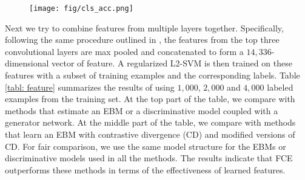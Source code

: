 \documentclass[10pt,twocolumn,letterpaper]{article}
\begin{document}
\begin{figure}
\begin{center}
	\texttt{[image: fig/cls\_acc.png]}
    \label{fig: cls_acc}
\end{center}
\end{figure} 

Next we try to combine features from multiple layers together. Specifically, following the same procedure outlined in \cite{radford2015unsupervised}, the features from the top three convolutional layers are max pooled and concatenated to form a $14,336$-dimensional vector of feature. A regularized L2-SVM is then trained on these features with a subset of training examples and the corresponding labels. Table \ref{tabl: feature} summarizes the results of using $1,000$, $2,000$ and $4,000$ labeled examples from the training set. At the top part of the table, we compare with methods that estimate an EBM or a discriminative model coupled with a generator network. At the middle part of the table, we compare with methods that learn an EBM with contrastive divergence (CD) and modified versions of CD. For fair comparison, we use the same model structure for the EBMs or discriminative models used in all the methods. The results indicate that FCE outperforms these methods in terms of the effectiveness of learned features.  
\end{document}
